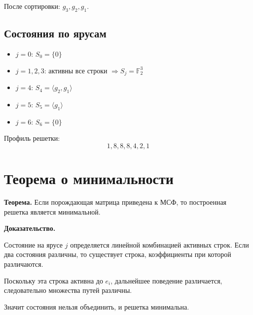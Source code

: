 \documentclass[a4paper,12pt]{article}
\begin{document}
После сортировки: $g_3, g_2, g_1$.

\subsection{Состояния по ярусам}

\begin{itemize}
    \item $j=0$: $S_0 = \{0\}$
    \item $j=1,2,3$: активны все строки $\Rightarrow S_j = \mathbb{F}_2^3$
    \item $j=4$: $S_4 = \langle g_2, g_1 \rangle$
    \item $j=5$: $S_5 = \langle g_1 \rangle$
    \item $j=6$: $S_6 = \{0\}$
\end{itemize}

Профиль решетки:
\[
1, 8, 8, 8, 4, 2, 1
\]

\section{Теорема о минимальности}

\textbf{Теорема.} Если порождающая матрица приведена к МСФ, то построенная решетка является минимальной.

\textbf{Доказательство.}

Состояние на ярусе $j$ определяется линейной комбинацией активных строк.
Если два состояния различны, то существует строка, коэффициенты при которой различаются.

Поскольку эта строка активна до $e_i$, дальнейшее поведение различается,
следовательно множества путей различны.

Значит состояния нельзя объединить, и решетка минимальна.
\end{document}
